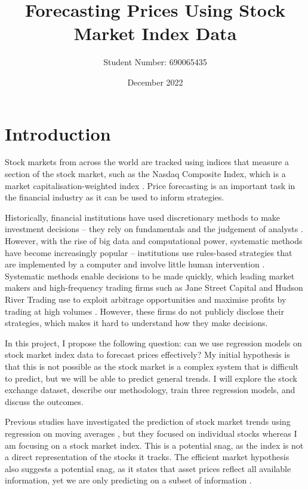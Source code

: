 \documentclass[a4paper, 11pt]{article}
\begin{document}
\title{Forecasting Prices Using Stock Market Index Data}
\author{Student Number: 690065435}
\date{December 2022}
\maketitle

\section{Introduction}
Stock markets from across the world are tracked using indices that measure a section of the stock market, such as the Nasdaq Composite Index, which is a market capitalisation-weighted index \cite{nasdaqCompositeWeighting}. Price forecasting is an important task in the financial industry as it can be used to inform strategies.

Historically, financial institutions have used discretionary methods to make investment decisions -- they rely on fundamentals and the judgement of analysts \cite{harvey2017man}. However, with the rise of big data and computational power, systematic methods have become increasingly popular -- institutions use rules-based strategies that are implemented by a computer and involve little human intervention \cite{harvey2017man}. Systematic methods enable decisions to be made quickly, which leading market makers and high-frequency trading firms such as Jane Street Capital and Hudson River Trading use to exploit arbitrage opportunities and maximise profits by trading at high volumes \cite{aldridge2013high}. However, these firms do not publicly disclose their strategies, which makes it hard to understand how they make decisions.

In this project, I propose the following question: can we use regression models on stock market index data to forecast prices effectively? My initial hypothesis is that this is not possible as the stock market is a complex system that is difficult to predict, but we will be able to predict general trends. I will explore the stock exchange dataset, describe our methodology, train three regression models, and discuss the outcomes.

Previous studies have investigated the prediction of stock market trends using regression on moving averages \cite{dinesh2021prediction}, but they focused on individual stocks whereas I am focusing on a stock market index. This is a potential snag, as the index is not a direct representation of the stocks it tracks. The efficient market hypothesis also suggests a potential snag, as it states that asset prices reflect all available information, yet we are only predicting on a subset of information \cite{fama1970efficient}. 
\end{document}
